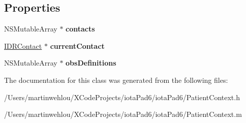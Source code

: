 \subsection*{Properties}
\begin{DoxyCompactItemize}
\item 
\hypertarget{interface_patient_context_a7b36705ee8a1b881113fdfca4f656dc1}{
NSMutableArray $\ast$ {\bfseries contacts}}
\label{interface_patient_context_a7b36705ee8a1b881113fdfca4f656dc1}

\item 
\hypertarget{interface_patient_context_aa3b3234c39311708ad7e8d469f734b86}{
\hyperlink{interface_i_d_r_contact}{IDRContact} $\ast$ {\bfseries currentContact}}
\label{interface_patient_context_aa3b3234c39311708ad7e8d469f734b86}

\item 
\hypertarget{interface_patient_context_a2f3d13f28d1666f3f51babbca3a145b3}{
NSMutableArray $\ast$ {\bfseries obsDefinitions}}
\label{interface_patient_context_a2f3d13f28d1666f3f51babbca3a145b3}

\end{DoxyCompactItemize}


The documentation for this class was generated from the following files:\begin{DoxyCompactItemize}
\item 
/Users/martinwehlou/XCodeProjects/iotaPad6/iotaPad6/PatientContext.h\item 
/Users/martinwehlou/XCodeProjects/iotaPad6/iotaPad6/PatientContext.m\end{DoxyCompactItemize}

